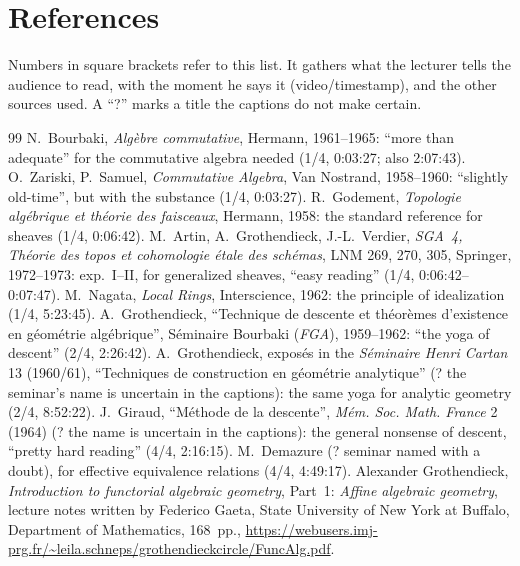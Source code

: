 \documentclass[11pt]{article}
\begin{document}
\section*{References}
\noindent Numbers in square brackets refer to this list. It gathers what the lecturer tells the audience to read, with the moment he says it (video/timestamp), and the other sources used. A ``?'' marks a title the captions do not make certain.
\begingroup\renewcommand{\section}[2]{}\setlength{\itemsep}{1pt}\small
\begin{thebibliography}{99}
 N.~Bourbaki, \emph{Algèbre commutative}, Hermann, 1961--1965: ``more than adequate'' for the commutative algebra needed (1/4, 0:03:27; also 2:07:43).
 O.~Zariski, P.~Samuel, \emph{Commutative Algebra}, Van Nostrand, 1958--1960: ``slightly old-time'', but with the substance (1/4, 0:03:27).
 R.~Godement, \emph{Topologie algébrique et théorie des faisceaux}, Hermann, 1958: the standard reference for sheaves (1/4, 0:06:42).
 M.~Artin, A.~Grothendieck, J.-L.~Verdier, \emph{SGA~4, Théorie des topos et cohomologie étale des schémas}, LNM 269, 270, 305, Springer, 1972--1973: exp.~I--II, for generalized sheaves, ``easy reading'' (1/4, 0:06:42--0:07:47).
 M.~Nagata, \emph{Local Rings}, Interscience, 1962: the principle of idealization (1/4, 5:23:45).
 A.~Grothendieck, ``Technique de descente et théorèmes d'existence en géométrie algébrique'', Séminaire Bourbaki (\emph{FGA}), 1959--1962: ``the yoga of descent'' (2/4, 2:26:42).
 A.~Grothendieck, exposés in the \emph{Séminaire Henri Cartan} 13 (1960/61), ``Techniques de construction en géométrie analytique'' (? the seminar's name is uncertain in the captions): the same yoga for analytic geometry (2/4, 8:52:22).
 J.~Giraud, ``Méthode de la descente'', \emph{Mém. Soc. Math. France} 2 (1964) (? the name is uncertain in the captions): the general nonsense of descent, ``pretty hard reading'' (4/4, 2:16:15).
 M.~Demazure (? seminar named with a doubt), for effective equivalence relations (4/4, 4:49:17).
 Alexander Grothendieck, \emph{Introduction to functorial algebraic geometry}, Part~1: \emph{Affine algebraic geometry}, lecture notes written by Federico Gaeta, State University of New York at Buffalo, Department of Mathematics, 168~pp., \url{https://webusers.imj-prg.fr/~leila.schneps/grothendieckcircle/FuncAlg.pdf}.
\end{thebibliography}
\endgroup
\end{document}
